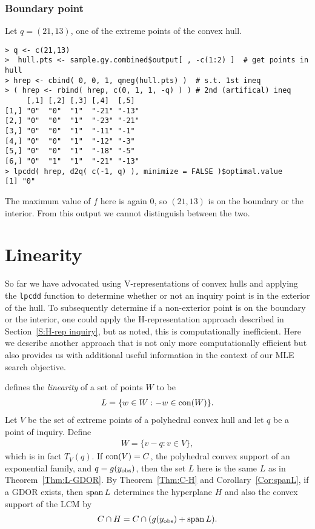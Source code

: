 \subsubsection{Boundary point}
Let $q = (21,13)$, one of the extreme points of the convex hull.
\begin{verbatim}
> q <- c(21,13) 
>  hull.pts <- sample.gy.combined$output[ , -c(1:2) ]  # get points in hull
> hrep <- cbind( 0, 0, 1, qneg(hull.pts) )	# s.t. 1st ineq
> ( hrep <- rbind( hrep, c(0, 1, 1, -q) ) )	# 2nd (artifical) ineq
     [,1] [,2] [,3] [,4]  [,5] 
[1,] "0"  "0"  "1"  "-21" "-13"
[2,] "0"  "0"  "1"  "-23" "-21"
[3,] "0"  "0"  "1"  "-11" "-1" 
[4,] "0"  "0"  "1"  "-12" "-3" 
[5,] "0"  "0"  "1"  "-18" "-5" 
[6,] "0"  "1"  "1"  "-21" "-13"
> lpcdd( hrep, d2q( c(-1, q) ), minimize = FALSE )$optimal.value
[1] "0"
\end{verbatim}
The maximum value of $f$ here is again 0, so $(21,13)$ is on the boundary or the interior.
From this output we cannot distinguish between the two.

\section{Linearity}\label{S:linearity}
So far we have advocated using V-representations of convex hulls and applying
the \texttt{lpcdd} function to determine whether or not an inquiry point is
in the exterior of the hull.  To subsequently determine if a non-exterior point 
is on the boundary or the interior, one could apply the 
H-representation approach described in 
Section~\ref{S:H-rep inquiry}, but as noted, this is computationally inefficient.
Here we describe another approach that is not only more computationally efficient
but also provides us with additional useful information in the context of our
MLE search objective.

\citet{Geyer:gdor} defines the \emph{linearity} of a set of points $W$ to be
\begin{align*}
	L = \{ w \in W: -w \in \operatorname{con}( W ) \}.
\end{align*}
Let $V$ be the set of extreme points of a polyhedral convex hull and let $q$ be a point of inquiry.
Define 
\begin{align*}
W = \{ v - q: v \in V \},
\end{align*}
which is in fact $T_V(q)$.  If $\operatorname{con}( V ) = C$, the
polyhedral convex support of an exponential family, and $q = g(y_{\text{obs}})$, then the set 
$L$ here is the same $L$ as in Theorem~\ref{Thm:L-GDOR}.    
By Theorem~\ref{Thm:C-H} and Corollary~\ref{Cor:spanL}, if a GDOR 
exists, then $\operatorname{span} L$  
determines the hyperplane $H$ and also the convex support of the LCM by
\begin{align*}
	C \cap H = C \cap (g(y_{\text{obs}}) + \operatorname{span} L).
\end{align*}

